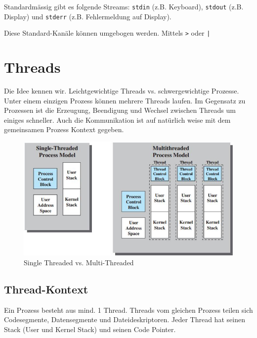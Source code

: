 Standardmässig gibt es folgende Streams: \texttt{stdin} (z.B. Keyboard), \texttt{stdout} (z.B. Display) und \texttt{stderr} (z.B. Fehlermeldung auf Display).

Diese Standard-Kanäle können umgebogen werden. Mittels \texttt{>} oder \texttt{|}

\section{Threads}
Die Idee kennen wir. Leichtgewichtige Threads vs. schwergewichtige Prozesse. Unter einem einzigen Prozess können mehrere Threads laufen. Im Gegensatz zu Prozessen ist die Erzeugung, Beendigung und Wechsel zwischen Threads um einiges schneller. Auch die Kommunikation ist auf natürlich weise mit dem gemeinsamen Prozess Kontext gegeben.

\begin{figure}[h!]
\centering
\includegraphics[width=0.7\linewidth]{fig/system-software-single-threaded-vs-muli-threaded}
\caption{Single Threaded vs. Multi-Threaded}
\label{fig:system-software-single-threaded-vs-muli-threaded}
\end{figure}

\subsection{Thread-Kontext}
Ein Prozess besteht aus mind. 1 Thread. Threads vom gleichen Prozess teilen sich Codesegmente, Datensegmente und Dateideskriptoren. Jeder Thread hat seinen Stack (User und Kernel Stack) und seinen Code Pointer.

